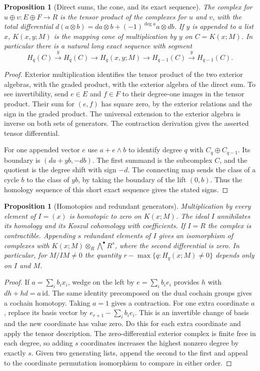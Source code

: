 \documentclass[11pt,oneside,openany]{book}
\newtheorem{proposition}[theorem]{Proposition}
\theoremstyle{definition}
\theoremstyle{remark}
\begin{document}
\begin{proposition}[Direct sums, the cone, and its exact sequence]
\label{res:RK-05}
The complex for $u\oplus v:E\oplus F\to R$ is the tensor product of
the complexes for $u$ and $v$, with the total differential
$d(a\otimes b)=da\otimes b+(-1)^{\deg a}a\otimes db$. If $y$ is
appended to a list $x$, $K(x,y;M)$ is the mapping cone of multiplication
by $y$ on $C=K(x;M)$. In particular there is a natural long exact
sequence with segment
\[
 H_q(C)\xrightarrow{y}H_q(C)\longrightarrow H_q(x,y;M)
 \longrightarrow H_{q-1}(C)\xrightarrow{y}H_{q-1}(C).
\]
\end{proposition}
\begin{proof}
Exterior multiplication identifies the tensor product of the two
exterior algebras, with the graded product, with the exterior algebra
of the direct sum. To see invertibility, send $e\in E$ and $f\in F$
to their degree-one images in the tensor product. Their sum for
$(e,f)$ has square zero, by the exterior relations and the sign in the
graded product. The universal extension to the exterior algebra is
inverse on both sets of generators. The contraction derivation gives
the asserted tensor differential.

For one appended vector $e$ use $a+e\wedge b$ to identify degree $q$
with $C_q\oplus C_{q-1}$. Its boundary is
$(da+yb,-db)$. The first summand is the subcomplex $C$, and the
quotient is the degree shift with sign $-d$. The connecting map
sends the class of a cycle $b$ to the class of $yb$, by taking
the boundary of the lift $(0,b)$. Thus the homology sequence of this
short exact sequence gives the stated signs.
\end{proof}

\begin{proposition}[Homotopies and redundant generators]\label{res:RK-06}
Multiplication by every element of $I=(x)$ is homotopic to zero on
$K(x;M)$. The ideal $I$ annihilates its homology and its Koszul
cohomology with coefficients. If $I=R$ the complex is contractible.
Appending $s$ redundant elements of $I$ gives an isomorphism of
complexes with $K(x;M)\otimes_R\bigwedge^\bullet R^s$, where the
second differential is zero. In particular, for $M/IM\ne0$ the
quantity $r-\max\{q:H_q(x;M)\ne0\}$ depends only on $I$ and $M$.
\end{proposition}
\begin{proof}
If $a=\sum_i b_ix_i$, wedge on the left by $e=\sum_i b_i e_i$ provides
$h$ with $dh+hd=a\,\mathrm{id}$. The same identity precomposed on the
dual cochain groups gives a cochain homotopy. Taking $a=1$ gives a
contraction. For one extra coordinate $a$, replace its basis vector
by $e_{r+1}-\sum_i b_ie_i$. This is an invertible change of basis
and the new coordinate has value zero. Do this for each extra
coordinate and apply the tensor description. The zero-differential
exterior complex is finite free in each degree, so adding $s$
coordinates increases the highest nonzero degree by exactly $s$.
Given two generating lists, append the second to the first and appeal
to the coordinate permutation isomorphism to compare in either order.
\end{proof}
\end{document}
